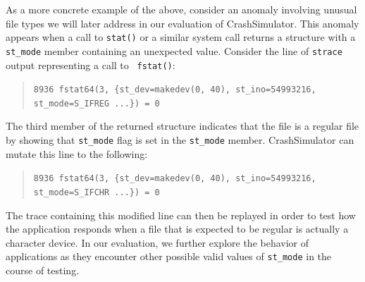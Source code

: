 As a more concrete example of the above, consider an anomaly
involving unusual file types we will later address in our evaluation of
CrashSimulator.
This anomaly appears when a call to {\tt stat()} or a similar system
call returns a structure with a {\tt st\_mode}
member containing an unexpected
value. Consider the line of {\tt strace} output representing a call to {\tt
  fstat()}:
\begin{quote}
  {\tt 8936  fstat64(3, \{st\_dev=makedev(0, 40), st\_ino=54993216, st\_mode=S\_IFREG ...\}) = 0}
\end{quote}
The third member of the returned structure indicates that the file is a
regular file by showing that {\tt st\_mode} flag is set in the {\tt st\_mode}
member.  CrashSimulator can mutate this  line to the following:

\begin{quote}
  {\tt 8936  fstat64(3, \{st\_dev=makedev(0, 40), st\_ino=54993216, st\_mode=S\_IFCHR ...\}) = 0}
\end{quote}

The trace containing this modified line can then be replayed in order to
test how the application responds when a file that is expected to be
regular is actually a character device. In our evaluation, we further
explore the behavior of applications as they encounter other possible valid
values of {\tt st\_mode} in the course of testing.
